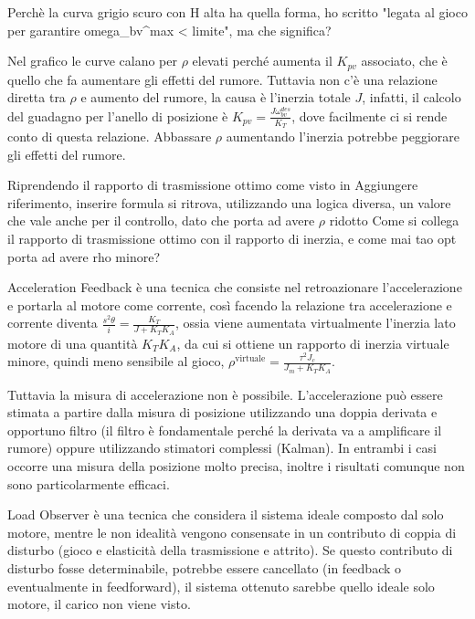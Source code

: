 {{\color{red}}Perchè la curva grigio scuro con H alta ha quella forma, ho scritto "legata al gioco per garantire omega_bv^max < limite", ma che significa?}

Nel grafico le curve calano per \(\rho\) elevati perché aumenta il \(K_{pv}\) associato, che è quello che fa aumentare gli effetti del rumore. Tuttavia non c'è una relazione diretta tra \(\rho\) e aumento del rumore, la causa è l'inerzia totale \(J\), infatti, il calcolo del guadagno per l'anello di posizione è \(K_{pv} = \frac{J \omega_{bv}^{des}}{K_T}\), dove facilmente ci si rende conto di questa relazione. Abbassare \(\rho\) aumentando l'inerzia potrebbe peggiorare gli effetti del rumore.

Riprendendo il rapporto di trasmissione ottimo come visto in {\color{red} Aggiungere riferimento, inserire formula} si ritrova, utilizzando una logica diversa, un valore che vale anche per il controllo, dato che porta ad avere \(\rho\) ridotto {\color{red}Come si collega il rapporto di trasmissione ottimo con il rapporto di inerzia, e come mai tao opt porta ad avere rho minore?}



Acceleration Feedback è una tecnica che consiste nel retroazionare l'accelerazione e portarla al motore come corrente, così facendo la relazione tra accelerazione e corrente diventa \(\frac{s^2\theta}{i} = \frac{K_T}{J + K_TK_A}\), ossia viene aumentata virtualmente l'inerzia lato motore di una quantità \(K_TK_A\), da cui si ottiene un rapporto di inerzia virtuale minore, quindi meno sensibile al gioco, \(\rho^\text{virtuale}=\frac{\tau^2 J_c}{J_m + K_TK_A}\).

Tuttavia la misura di accelerazione non è possibile. L'accelerazione può essere stimata a partire dalla misura di posizione utilizzando una doppia derivata e opportuno filtro (il filtro è fondamentale perché la derivata va a amplificare il rumore) oppure utilizzando stimatori complessi (Kalman). In entrambi i casi occorre una misura della posizione molto precisa, inoltre i risultati comunque non sono particolarmente efficaci.\label{misura_acc}



Load Observer è una tecnica che considera il sistema ideale composto dal solo motore, mentre le non idealità vengono consensate in un contributo di coppia di disturbo (gioco e elasticità della trasmissione e attrito).
Se questo contributo di disturbo fosse determinabile, potrebbe essere cancellato (in feedback o eventualmente in feedforward), il sistema ottenuto sarebbe quello ideale solo motore, il carico non viene visto.

